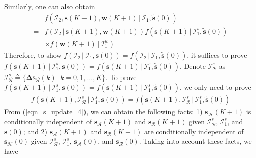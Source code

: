 \documentclass{IEEEtran}
\begin{document}
Similarly, one can also obtain
\begin{equation}
	\begin{aligned}
		& f(\mathcal{I}_2, \mathbf{s}(K+1), \mathbf{w}(K+1) \, | \, \mathcal{I}_1, \tilde{\mathbf{s}}(0)) \\
		= & f(\mathcal{I}_2 \, | \, \mathbf{s}(K+1), \mathbf{w}(K+1)) f(\mathbf{s}(K+1) \, | \, \mathcal{I}_1^s, \tilde{\mathbf{s}}(0)) \\
		& \times f(\mathbf{w}(K+1) \, | \, \mathcal{I}_1^w)
	\end{aligned} 
\end{equation}
Therefore, to show $f(\mathcal{I}_2 \, | \, \mathcal{I}_1, \mathbf{s}(0))= f(\mathcal{I}_2 \, | \, \mathcal{I}_1, \tilde{\mathbf{s}}(0))$, it suffices to prove $f(\mathbf{s}(K+1) \, | \, \mathcal{I}_1^s, \mathbf{s}(0))=f(\mathbf{s}(K+1) \, | \, \mathcal{I}_1^s, \tilde{\mathbf{s}}(0))$. Denote $\mathcal{I}_{\mathcal{R}}^s$ as $\mathcal{I}_{\mathcal{R}}^s \triangleq \{\boldsymbol{\Delta} \mathbf{s}_{\mathcal{R}}(k) \, | \, k=0,1,\ldots,K \}$. To prove $f(\mathbf{s}(K+1) \, | \, \mathcal{I}_1^s, \mathbf{s}(0))=f(\mathbf{s}(K+1) \, | \, \mathcal{I}_1^s, \tilde{\mathbf{s}}(0))$, we only need to prove 
\begin{equation}
	\begin{aligned}
		f(\mathbf{s}(K+1), \mathcal{I}_{\mathcal{R}}^s \, | \, \mathcal{I}_1^s, \mathbf{s}(0))=f(\mathbf{s}(K+1), \mathcal{I}_{\mathcal{R}}^s \, | \, \mathcal{I}_1^s, \tilde{\mathbf{s}}(0))
	\end{aligned} 
\end{equation}
From (\ref{eqn_s_update_4}), we can obtain the following facts: 1) $\mathbf{s}_{\mathcal{H}}(K+1)$ is conditionally independent of $\mathbf{s}_{\mathcal{A}}(K+1)$ and $\mathbf{s}_{\mathcal{R}}(K+1)$ given $\mathcal{I}_{\mathcal{R}}^s$, $\mathcal{I}_1^s$, and $\mathbf{s}(0)$; and 2) $\mathbf{s}_{\mathcal{A}}(K+1)$ and $\mathbf{s}_{\mathcal{R}}(K+1)$ are conditionally independent of $\mathbf{s}_{\mathcal{H}}(0)$ given $\mathcal{I}_{\mathcal{R}}^s$, $\mathcal{I}_1^s$, $\mathbf{s}_{\mathcal{A}}(0)$, and $\mathbf{s}_{\mathcal{R}}(0)$. Taking into account these facts, we have
\end{document}
